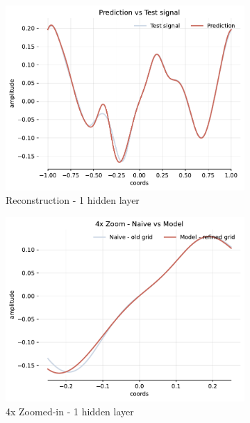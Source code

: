 \begin{figure}[!h]
    \begin{subfigure}[b]{0.32\textwidth}
        \centering
        \includegraphics[width=\textwidth]{img/ch3/pred-6hf-1hl-1w-sub7.pdf}
        \caption{Reconstruction - 1 hidden layer}
    \end{subfigure}
    \begin{subfigure}[b]{0.32\textwidth}
        \centering
        \includegraphics[width=\textwidth]{img/ch3/4x-6hf-1hl-1w-sub7.pdf}
        \caption{4x Zoomed-in - 1 hidden layer}
    \end{subfigure}
    \begin{subfigure}[b]{0.32\textwidth}

\end{subfigure}
\end{figure}
